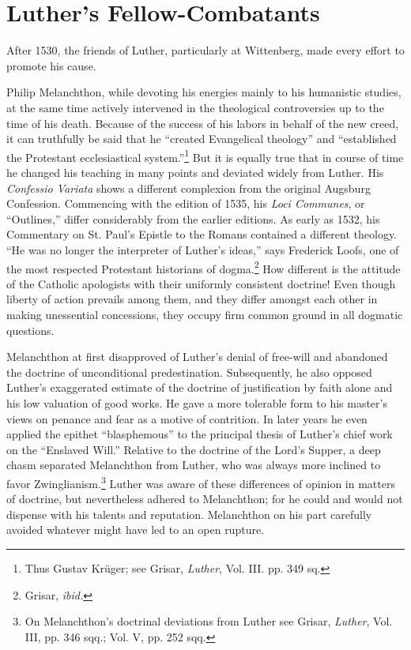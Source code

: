 \section{Luther’s Fellow-Combatants}

After 1530, the friends of Luther, particularly at Wittenberg,
made every effort to promote his cause.

Philip Melanchthon, while devoting his energies mainly to his
humanistic studies, at the same time actively intervened in the theological
controversies up to the time of his death. Because of the
success of his labors in behalf of the new creed, it can truthfully
be said that he “created Evangelical theology” and “established the
Protestant ecclesiastical system.”\footnote{Thus Gustav Krüger; see Grisar, \textit{Luther}, Vol. III. pp. 349 sq.}
 But it is equally true that in course
of time he changed his teaching in many points and deviated widely
from Luther. His \textit{Confessio Variata} shows a different complexion
from the original Augsburg Confession. Commencing with the
edition of 1535, his \textit{Loci Communes}, or “Outlines,” differ considerably
from the earlier editions. As early as 1532, his Commentary
on St. Paul’s Epistle to the Romans contained a different theology.
“He was no longer the interpreter of Luther’s ideas,” says Frederick
Loofs, one of the most respected Protestant historians of dogma.\footnote{Grisar, \textit{ibid.}}
How different is the attitude of the Catholic apologists with their
uniformly consistent doctrine! Even though liberty of action prevails
among them, and they differ amongst each other in making
unessential concessions, they occupy firm common ground in all
dogmatic questions.

Melanchthon at first disapproved of Luther’s denial of free-will
and abandoned the doctrine of unconditional predestination. Subsequently,
he also opposed Luther’s exaggerated estimate of the
doctrine of justification by faith alone and his low valuation of good
works. He gave a more tolerable form to his master’s views on
penance and fear as a motive of contrition. In later years he even
applied the epithet ``blasphemous'' to the principal thesis of Luther’s
chief work on the “Enslaved Will.” Relative to the doctrine of the
Lord’s Supper, a deep chasm separated Melanchthon from Luther,
who was always more inclined to favor Zwinglianism.\footnote
{On Melanchthon’s doctrinal deviations from Luther see Grisar, \textit{Luther}, Vol. III, pp.
346 sqq.; Vol. V, pp. 252 sqq.}
Luther
was aware of these differences of opinion in matters of doctrine,
but nevertheless adhered to Melanchthon; for he could and would
not dispense with his talents and reputation. Melanchthon on
his part carefully avoided whatever might have led to an open rupture.

